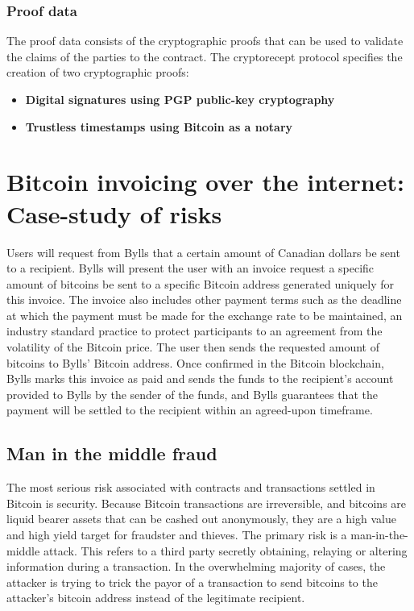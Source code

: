 \subsubsection{Proof data}

The proof data consists of the cryptographic proofs that can be used to validate the claims of the parties to the contract. The cryptorecept protocol specifies the creation of two cryptographic proofs:

\begin{itemize}

\item \textbf{Digital signatures using PGP public-key cryptography}
\item \textbf{Trustless timestamps using Bitcoin as a notary}


\end{itemize}


\section{Bitcoin invoicing over the internet: Case-study of risks}
Users will request from Bylls that a certain amount of Canadian dollars be sent to a recipient. Bylls will present the user with an invoice request a specific amount of bitcoins be sent to a specific Bitcoin address generated uniquely for this invoice. The invoice also includes other payment terms such as the deadline at which the payment must be made for the exchange rate to be maintained, an industry standard practice to protect participants to an agreement from the volatility of the Bitcoin price. The user then sends the requested amount of bitcoins to Bylls’ Bitcoin address. Once confirmed in the Bitcoin blockchain, Bylls marks this invoice as paid and sends the funds to the recipient’s account provided to Bylls by the sender of the funds, and Bylls guarantees that the payment will be settled to the recipient within an agreed-upon timeframe.



\subsection{Man in the middle fraud}
The most serious risk associated with contracts and transactions settled in Bitcoin is security. Because Bitcoin transactions are irreversible, and bitcoins are liquid bearer assets that can be cashed out anonymously, they are a high value and high yield target for fraudster and thieves. The primary risk is a man-in-the-middle attack. This refers to a third party secretly obtaining, relaying or altering information during a transaction. In the overwhelming majority of cases, the attacker is trying to trick the payor of a transaction to send bitcoins to the attacker’s bitcoin address instead of the legitimate recipient. 

